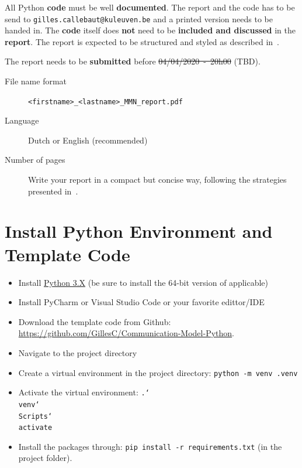 \documentclass[12pt,a4paper]{article}
\newcommand{\softDeadline}{\st{04/04/2020\ -\ 20h00} (TBD)}
\begin{document}
All Python \textbf{code} must be well \textbf{documented}.
The report and the code has to be send to \texttt{gilles.callebaut@kuleuven.be} and a printed version needs to be handed in. The \textbf{code} itself does \textbf{not} need to be \textbf{included and discussed} in the \textbf{report}. 
The report is expected to be structured and styled as described in~\cite{hoogenboom2012write,kallestinova2011write}.

The report needs to be \textbf{submitted} before \softDeadline.

\begin{description}
	\item[File name format]  \texttt{<firstname>\_<lastname>\_MMN\_report.pdf}
	\item[Language] Dutch or English (recommended)
	\item[Number of pages] Write your report in a compact but concise way, following the
	strategies presented in~\cite{hoogenboom2012write,kallestinova2011write}.
\end{description}

\cleardoublepage%
\appendix
\section{Install Python Environment and Template Code}
\begin{itemize}
	\item Install \href{https://www.python.org/downloads}{Python 3.X} (be sure to install the 64-bit version of applicable)
	\item Install PyCharm or Visual Studio Code or your favorite edittor/IDE
	\item Download the template code from Github: \url{https://github.com/GillesC/Communication-Model-Python}.
	\item Navigate to the project directory
	\item Create a virtual environment in the project directory: \texttt{python -m venv .venv}
	\item Activate the virtual environment:
	\texttt{.\char`\\venv\char`\\Scripts\char`\\activate}
	\item Install the packages through: \texttt{pip install -r requirements.txt} (in the project folder).
\end{itemize}






\end{document}

